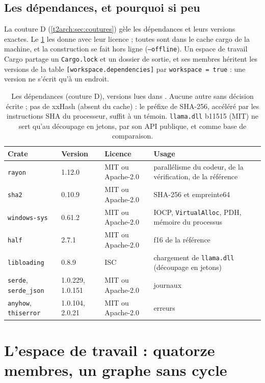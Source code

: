 \subsection{Les dépendances, et pourquoi si peu}

La couture D (\cref{t2arch:sec:coutures}) gèle les dépendances et leurs versions exactes. Le \cref{t2arch:tab:deps} les donne avec leur licence ; toutes sont dans le cache cargo de la machine, et la construction se fait hors ligne (\texttt{--offline}). Un espace de travail Cargo partage un \texttt{Cargo.lock} et un dossier de sortie, et ses membres héritent les versions de la table \texttt{[workspace.dependencies]} par \texttt{workspace = true} \cite{cargo2026workspaces} : une version ne s'écrit qu'à un endroit.

\begin{table}[ht]
\centering\small
\begin{tabularx}{\linewidth}{l l l >{\raggedright\arraybackslash}X}
\toprule
Crate & Version & Licence & Usage \\
\midrule
\texttt{rayon} & 1.12.0 & MIT ou Apache-2.0 & parallélisme du codeur, de la vérification, de la référence \\
\texttt{sha2} & 0.10.9 & MIT ou Apache-2.0 & SHA-256 et empreinte64 \\
\texttt{windows-sys} & 0.61.2 & MIT ou Apache-2.0 & IOCP, \texttt{VirtualAlloc}, PDH, mémoire du processus \\
\texttt{half} & 2.7.1 & MIT ou Apache-2.0 & f16 de la référence \\
\texttt{libloading} & 0.8.9 & ISC & chargement de \texttt{llama.dll} (découpage en jetons) \\
\texttt{serde}, \texttt{serde\_json} & 1.0.229, 1.0.151 & MIT ou Apache-2.0 & journaux \\
\texttt{anyhow}, \texttt{thiserror} & 1.0.104, 2.0.21 & MIT ou Apache-2.0 & erreurs \\
\bottomrule
\end{tabularx}
\caption[Les dépendances (couture D)]{Les dépendances (couture D), versions lues dans . Aucune autre sans décision écrite ; pas de xxHash (absent du cache) : le préfixe de SHA-256, accéléré par les instructions SHA du processeur, suffit à un témoin. \texttt{llama.dll} b11515 (MIT) ne sert qu'au découpage en jetons, par son API publique, et comme base de comparaison.}
\label{t2arch:tab:deps}
\end{table}

\section{L'espace de travail : quatorze membres, un graphe sans cycle}\label{t2arch:sec:caisses}

